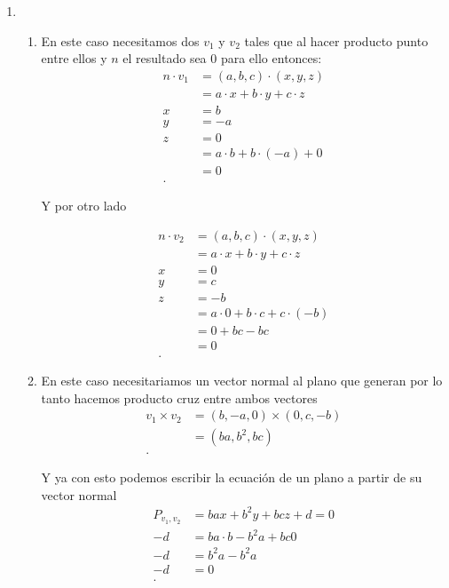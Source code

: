 


    

    \begin{enumerate}
      \item 
	\begin{enumerate}
	  \item En este caso necesitamos dos $v_1$ y $v_2$ tales que al hacer producto punto entre ellos y $n$ el resultado sea 0 para ello entonces:
	    \begin{align*}
	      n\cdot v_{1} &= \left( a,b,c \right) \cdot \left( x,y,z \right)  \\
	      &= a\cdot x+b\cdot y+c\cdot z \\
	      x &= b \\
	      y &= -a\\
	      z &= 0 \\
	      &= a\cdot b + b \cdot \left( -a \right) + 0 \\
	      &= 0 \\
	    .\end{align*}

	    Y por otro lado

	    \begin{align*}
	      n\cdot v_2 &= \left( a,b,c \right) \cdot  \left( x,y,z \right)  \\
	      &= a\cdot x+b\cdot y+c\cdot z \\
	      x &= 0 \\
	      y &= c \\
	      z &= -b \\
	      &= a\cdot 0 + b\cdot c + c\cdot \left( -b \right)  \\
	      &= 0 + bc - bc \\
	      &= 0 \\
	    .\end{align*}
	  \item En este caso necesitariamos un vector normal al plano que generan por lo tanto hacemos producto cruz entre ambos vectores
	    \begin{align*}
	      v_1\times v_2 &= \left( b,-a,0 \right) \times \left( 0,c,-b \right) \\
	      &= \left( ba, b^2, bc \right)  \\
	    .\end{align*}

	    Y ya con esto podemos escribir la ecuación de un plano a partir de su vector normal
	    \begin{align*}
	      P_{v_1,v_2} &= ba x + b^2y + bc z + d = 0\\
	      -d &= ba\cdot b - b^2 a + bc 0 \\
	      -d &= b^2a - b^2a \\
	      -d &= 0 \\
	    .\end{align*}
	    

\end{enumerate}
\end{enumerate}
